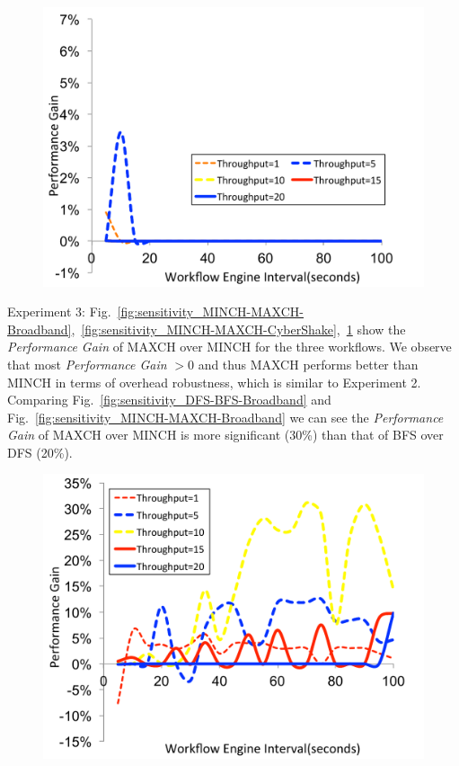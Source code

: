 \begin{figure}[!htb]
\centering
 \includegraphics[width=0.9\linewidth]{figures/sensitivity/MINCH-MAXCH-Montage.pdf}
  \label{fig:sensitivity_MINCH-MAXCH-Montage}
\end{figure}



Experiment 3: Fig.~\ref{fig:sensitivity_MINCH-MAXCH-Broadband},~\ref{fig:sensitivity_MINCH-MAXCH-CyberShake},~\ref{fig:sensitivity_MINCH-MAXCH-Montage} show the \emph{Performance Gain} of MAXCH over MINCH for the three workflows. We observe that most  \emph{Performance Gain} $>0$ and thus MAXCH performs better than MINCH in terms of overhead robustness, which is similar to Experiment 2. Comparing Fig.~\ref{fig:sensitivity_DFS-BFS-Broadband} and Fig.~\ref{fig:sensitivity_MINCH-MAXCH-Broadband} we can see the \emph{Performance Gain} of MAXCH over MINCH is more significant (30\%) than that of BFS over DFS (20\%).  
\begin{figure}[!htb]
\centering
 \includegraphics[width=0.9\linewidth]{figures/sensitivity/UIFS-IFS-Broadband.pdf}
  \label{fig:sensitivity_UIFS-IFS-Broadband}
\end{figure}


